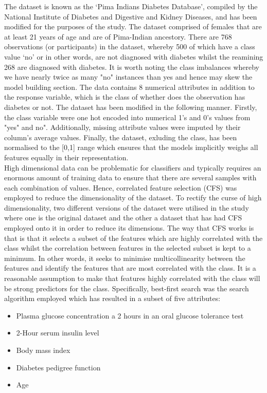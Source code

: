 \documentclass[12pt]{article}
\begin{document}
The dataset is known as the ‘Pima Indians Diabetes Database’, compiled by the National Institute of Diabetes and Digestive and Kidney Diseases, and has been modified for the purposes of the study. The dataset comprised of females that are at least 21 years of age and are of Pima-Indian ancestory. There are 768 observations (or participants) in the dataset, whereby 500 of which have a class value ‘no’ or in other words, are not diagnosed with diabetes whilst the reamining 268 are diagnosed with diabetes. It is worth noting the class imbalances whereby we have nearly twice as many "no" instances than yes and hence may skew the model building section. The data contains 8 numerical attributes in addition to the response variable, which is the class of whether does the observation has diabetes or not. The dataset has been modified in the following manner. Firstly, the class variable were one hot encoded into numerical 1's and 0's values from "yes" and no". Additionally, missing attribute values were imputed by their column's average values. Finally, the dataset, exluding the class, has been normalised to the [0,1] range which ensures that the models implicitly weighs all features equally in their representation.\\

High dimensional data can be problematic for classifiers and typically requires an enormous amount of training data to ensure that there are several samples with each combination of values. Hence, correlated feature selection (CFS) was employed to reduce the dimensionality of the dataset. To rectify the curse of high dimensionality, two different versions of the dataset were utilised in the study where one is the original dataset and the other a dataset that has had CFS employed onto it in order to reduce its dimensions. The way that CFS works is that is that it selects a subset of the features which are highly correlated with the class whilst the correlation between features in the selected subset is kept to a minimum. In other words, it seeks to minimise multicollinearity between the features and identify the features that are most correlated with the class. It is a reasonable assumption to make that features highly correlated with the class will be strong predictors for the class. Specifically, best-first search was the search algorithm employed which has resulted in a subset of five attributes:

\begin{itemize}
	\item Plasma glucose concentration a 2 hours in an oral glucose tolerance test
	\item 2-Hour serum insulin level
	\item Body mass index
	\item Diabetes pedigree function
	\item Age
\end{itemize}
\end{document}
